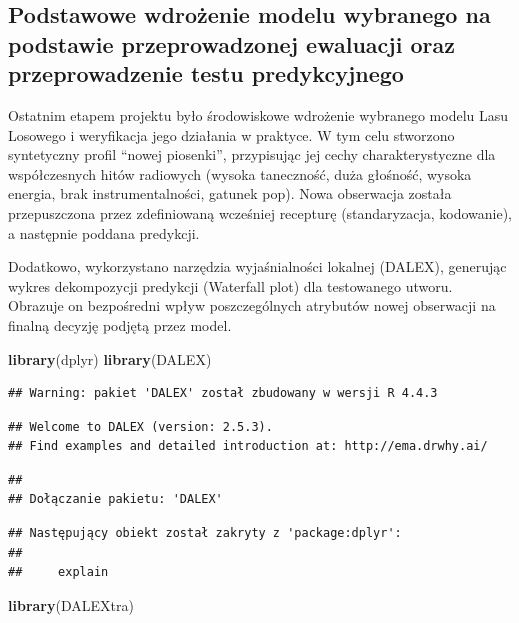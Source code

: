 \documentclass[
]{article}
\newenvironment{Shaded}{\begin{snugshade}}{\end{snugshade}}
\newcommand{\FunctionTok}[1]{\textcolor[rgb]{0.13,0.29,0.53}{\textbf{#1}}}
\newcommand{\NormalTok}[1]{#1}
\begin{document}
\subsection{Podstawowe wdrożenie modelu wybranego na podstawie
przeprowadzonej ewaluacji oraz przeprowadzenie testu
predykcyjnego}\label{podstawowe-wdroux17cenie-modelu-wybranego-na-podstawie-przeprowadzonej-ewaluacji-oraz-przeprowadzenie-testu-predykcyjnego}

Ostatnim etapem projektu było środowiskowe wdrożenie wybranego modelu
Lasu Losowego i weryfikacja jego działania w praktyce. W tym celu
stworzono syntetyczny profil ``nowej piosenki'', przypisując jej cechy
charakterystyczne dla współczesnych hitów radiowych (wysoka taneczność,
duża głośność, wysoka energia, brak instrumentalności, gatunek pop).
Nowa obserwacja została przepuszczona przez zdefiniowaną wcześniej
recepturę (standaryzacja, kodowanie), a następnie poddana predykcji.

Dodatkowo, wykorzystano narzędzia wyjaśnialności lokalnej (DALEX),
generując wykres dekompozycji predykcji (Waterfall plot) dla testowanego
utworu. Obrazuje on bezpośredni wpływ poszczególnych atrybutów nowej
obserwacji na finalną decyzję podjętą przez model.

\begin{Shaded}
\begin{Highlighting}[]
\FunctionTok{library}\NormalTok{(dplyr)}
\FunctionTok{library}\NormalTok{(DALEX)}
\end{Highlighting}
\end{Shaded}

\begin{verbatim}
## Warning: pakiet 'DALEX' został zbudowany w wersji R 4.4.3
\end{verbatim}

\begin{verbatim}
## Welcome to DALEX (version: 2.5.3).
## Find examples and detailed introduction at: http://ema.drwhy.ai/
\end{verbatim}

\begin{verbatim}
## 
## Dołączanie pakietu: 'DALEX'
\end{verbatim}

\begin{verbatim}
## Następujący obiekt został zakryty z 'package:dplyr':
## 
##     explain
\end{verbatim}

\begin{Shaded}
\begin{Highlighting}[]
\FunctionTok{library}\NormalTok{(DALEXtra)}
\end{Highlighting}
\end{Shaded}
\end{document}
